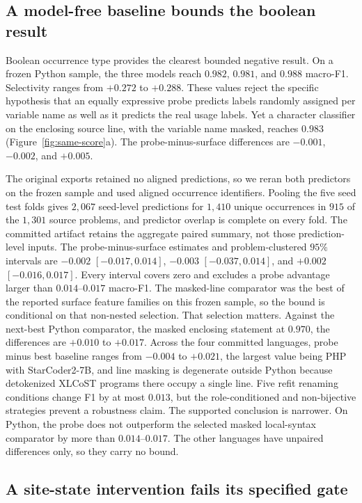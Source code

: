 \documentclass{article}
\begin{document}
\subsection{A model-free baseline bounds the boolean result}

Boolean occurrence type provides the clearest bounded negative result. On a
frozen Python sample, the three models reach
$0.982$, $0.981$, and $0.988$ macro-F1. Selectivity ranges from $+0.272$ to
$+0.288$. These values reject the specific hypothesis that an equally
expressive probe predicts labels randomly assigned per variable name as well
as it predicts the real usage labels. Yet a character classifier on
the enclosing source line, with the variable name masked, reaches $0.983$
(Figure~\ref{fig:same-score}a).
The probe-minus-surface differences are $-0.001$, $-0.002$, and $+0.005$.

The original exports retained no aligned predictions, so we reran both
predictors on the frozen sample and used aligned occurrence identifiers.
Pooling the five seed test folds gives $2{,}067$ seed-level predictions for
$1{,}410$ unique occurrences in $915$ of the $1{,}301$ source problems, and
predictor overlap is complete on every fold. The committed artifact retains the
aggregate paired summary, not those prediction-level inputs. The
probe-minus-surface estimates and problem-clustered $95\%$ intervals are
$-0.002$ $[-0.017, 0.014]$, $-0.003$ $[-0.037, 0.014]$, and $+0.002$
$[-0.016, 0.017]$. Every interval covers zero and excludes a probe advantage
larger than $0.014$--$0.017$ macro-F1. The masked-line comparator was the best
of the reported surface feature families on this frozen sample, so the bound
is conditional on that non-nested selection. That selection matters. Against
the next-best Python comparator, the masked enclosing statement at $0.970$,
the differences are $+0.010$ to $+0.017$. Across the four committed languages,
probe minus best baseline ranges from $-0.004$ to $+0.021$, the largest value
being PHP with StarCoder2-7B, and line masking is degenerate outside Python
because detokenized XLCoST programs there occupy a single line.
Five refit renaming conditions
change F1 by at most $0.013$, but the role-conditioned and non-bijective
strategies prevent a robustness claim. The supported conclusion is narrower.
On Python, the probe does not outperform the selected masked local-syntax
comparator by more than $0.014$--$0.017$. The other languages have unpaired
differences only, so they carry no bound.

\subsection{A site-state intervention fails its specified gate}
\end{document}
